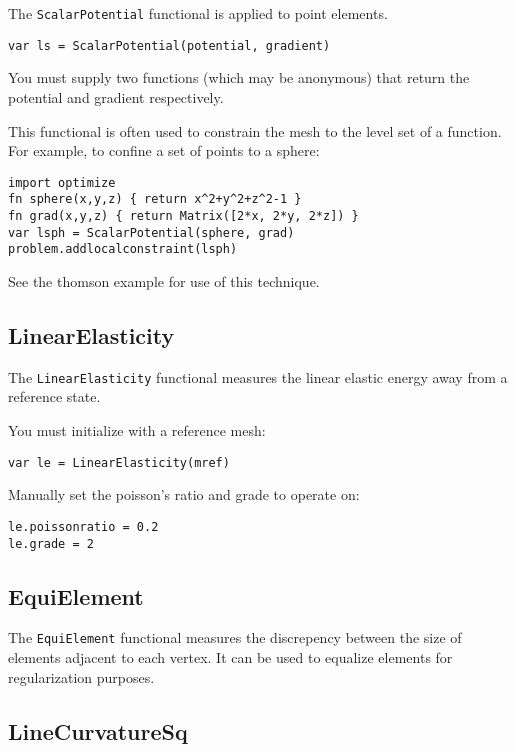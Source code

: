 The \texttt{ScalarPotential} functional is applied to point elements.

\begin{lstlisting}
var ls = ScalarPotential(potential, gradient)
\end{lstlisting}

You must supply two functions (which may be anonymous) that return the
potential and gradient respectively.

This functional is often used to constrain the mesh to the level set of
a function. For example, to confine a set of points to a sphere:

\begin{lstlisting}
import optimize
fn sphere(x,y,z) { return x^2+y^2+z^2-1 }
fn grad(x,y,z) { return Matrix([2*x, 2*y, 2*z]) }
var lsph = ScalarPotential(sphere, grad)
problem.addlocalconstraint(lsph)
\end{lstlisting}

See the thomson example for use of this technique.

\hypertarget{linearelasticity}{%
\subsection{LinearElasticity}\label{linearelasticity}}

The \texttt{LinearElasticity} functional measures the linear elastic
energy away from a reference state.

You must initialize with a reference mesh:

\begin{lstlisting}
var le = LinearElasticity(mref)
\end{lstlisting}

Manually set the poisson's ratio and grade to operate on:

\begin{lstlisting}
le.poissonratio = 0.2
le.grade = 2
\end{lstlisting}

\hypertarget{equielement}{%
\subsection{EquiElement}\label{equielement}}

The \texttt{EquiElement} functional measures the discrepency between the
size of elements adjacent to each vertex. It can be used to equalize
elements for regularization purposes.

\hypertarget{linecurvaturesq}{%
\subsection{LineCurvatureSq}\label{linecurvaturesq}}

